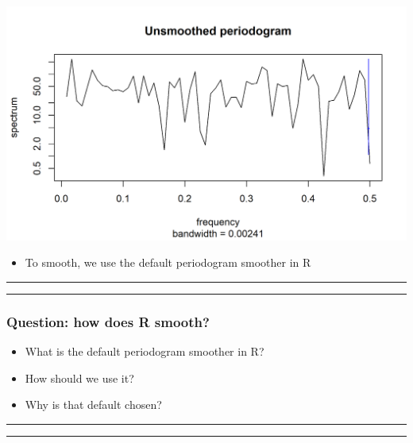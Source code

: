 \documentclass[]{article}
\providecommand{\tightlist}{%
  \setlength{\itemsep}{0pt}\setlength{\parskip}{0pt}}
\begin{document}
\begin{center}\includegraphics{figure/intro-periodogram-1} \end{center}

\begin{itemize}
\tightlist
\item
  To smooth, we use the default periodogram smoother in R
\end{itemize}

\begin{center}\rule{0.5\linewidth}{\linethickness}\end{center}

\begin{center}\rule{0.5\linewidth}{\linethickness}\end{center}

\subsubsection{Question: how does R
smooth?}\label{question-how-does-r-smooth}

\begin{itemize}
\item
  What is the default periodogram smoother in R?
\item
  How should we use it?
\item
  Why is that default chosen?
\end{itemize}

\begin{center}\rule{0.5\linewidth}{\linethickness}\end{center}

\begin{center}\rule{0.5\linewidth}{\linethickness}\end{center}
\end{document}
